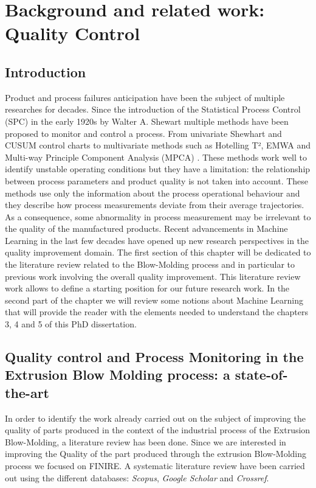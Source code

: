 \chapter{Background and related work: Quality Control}
\minitoc

\section{Introduction}

Product and process failures anticipation have been the subject of multiple researches for decades. Since the introduction of the Statistical Process Control (SPC) in the early 1920s by Walter A. Shewart multiple methods have been proposed to monitor and control a process. From univariate Shewhart and  CUSUM \citep{woodall1985multivariate} \citep{crosier1988multivariate} control charts to multivariate methods such as Hotelling T², EMWA \citep{lowry1992multivariate} and Multi-way Principle Component Analysis (MPCA) \citep{nomikos1994monitoring}. These methods work well to identify unstable operating conditions but they have a limitation: the relationship between process parameters and product quality is not taken into account. These methods use only the information about the process operational behaviour and they describe how process measurements deviate from their average trajectories. As a consequence, some abnormality in process measurement may be irrelevant to the quality of the manufactured products. Recent advancements in Machine Learning in the last few decades have opened up new research perspectives in the quality improvement domain. The first section of this chapter will be dedicated to the literature review related to the Blow-Molding process and in particular to previous work involving the overall quality improvement. This literature review work allows to define a starting position for our future research work. In the second part of the chapter we will review some notions about Machine Learning that will provide the reader with the elements needed to understand the chapters 3, 4 and 5 of this PhD dissertation. 

\section{Quality control and Process Monitoring in the Extrusion Blow Molding process: a state-of-the-art}


In order to identify the work already carried out on the subject of improving the quality of parts produced in the context of the industrial process of the Extrusion Blow-Molding, a literature review has been done. Since we are interested in improving the Quality of the part produced through the extrusion Blow-Molding process we focused on FINIRE. A systematic literature review have been carried out using the different databases: \textit{Scopus}, \textit{Google Scholar} and \textit{Crossref}.

